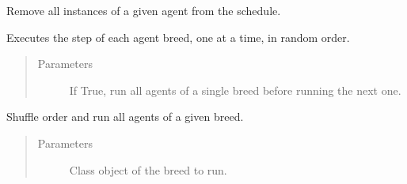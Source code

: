 \documentclass[letterpaper,10pt,english]{sphinxmanual}
\begin{document}
\begin{fulllineitems}
\begin{fulllineitems}
\end{fulllineitems}


\begin{fulllineitems}
\label{\detokenize{index:examples.wolf_sheep.wolf_sheep.schedule.RandomActivationByBreed.remove}}
Remove all instances of a given agent from the schedule.

\end{fulllineitems}


\begin{fulllineitems}
\label{\detokenize{index:examples.wolf_sheep.wolf_sheep.schedule.RandomActivationByBreed.step}}
Executes the step of each agent breed, one at a time, in random order.
\begin{quote}\begin{description}
\item[{Parameters}] \leavevmode
{} \textendash{} If True, run all agents of a single breed before running
the next one.

\end{description}\end{quote}

\end{fulllineitems}


\begin{fulllineitems}
\label{\detokenize{index:examples.wolf_sheep.wolf_sheep.schedule.RandomActivationByBreed.step_breed}}
Shuffle order and run all agents of a given breed.
\begin{quote}\begin{description}
\item[{Parameters}] \leavevmode
{} \textendash{} Class object of the breed to run.

\end{description}\end{quote}

\end{fulllineitems}


\end{fulllineitems}
\end{document}
